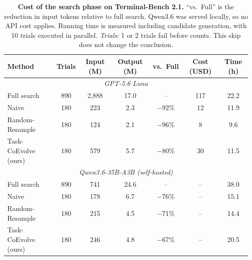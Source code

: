 \begin{table}[t]
\centering
\caption{\textbf{Cost of the search phase on Terminal-Bench 2.1.} ``vs.\ Full'' is the reduction in input tokens relative to
full search. Qwen3.6 was served locally, so no API cost applies. Running time is measured including candidate generation, with 10 trials executed in parallel. \emph{Trials}: 1 or 2 trials fail before counts. This skip does not change the conclusion.}
\label{table:tb2_cost}
\small
\setlength{\tabcolsep}{8pt}
\begin{tabular}{lcccccc}
\toprule
Method & Trials & Input (M) & Output (M) & vs.\ Full & Cost (USD) & Time (h) \\
\midrule
\multicolumn{7}{c}{\textit{GPT-5.6 Luna}} \\
Full search & 890 & 2{,}888 & 17.0 & -- & 117 & 22.2 \\
Naive & 180 & 223 & 2.3 & $-$92\% & 12 & 11.9 \\
Random-Resample & 180 & 124 & 2.1 & $-$96\% & 8 & 9.6 \\
Task-CoEvolve (ours) & 180 & 579 & 5.7 & $-$80\% & 30 & 11.5 \\
\midrule
\multicolumn{7}{c}{\textit{Qwen3.6-35B-A3B (self-hosted)}} \\
Full search & 890 & 741 & 24.6 & -- & -- & 38.0 \\
Naive & 180 & 178 & 6.7 & $-$76\% & -- & 15.1 \\
Random-Resample & 180 & 215 & 4.5 & $-$71\% & -- & 14.4 \\
Task-CoEvolve (ours) & 180 & 246 & 4.8 & $-$67\% & -- & 20.5 \\
\bottomrule
\end{tabular}
\end{table}